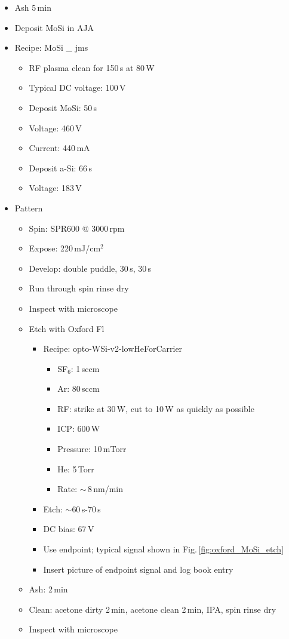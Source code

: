 \begin{itemize}
\item Ash 5\,min
\item Deposit MoSi in AJA
\item Recipe: MoSi \_ jms
\begin{itemize}
\item RF plasma clean for 150\,s at 80\,W
\item Typical DC voltage: 100\,V
\item Deposit MoSi: 50\,s
\item Voltage: 460\,V
\item Current: 440\,mA
\item Deposit a-Si: 66\,s
\item Voltage: 183\,V
\end{itemize}
\item Pattern
\begin{itemize}
\item Spin: SPR600 @ 3000\,rpm
\item Expose: 220\,mJ/cm$^2$
\item Develop: double puddle, 30\,s, 30\,s
\item Run through spin rinse dry
\item Inspect with microscope
\item Etch with Oxford Fl
\begin{itemize}
\item Recipe: opto-WSi-v2-lowHeForCarrier
\begin{itemize}
\item SF$_6$: 1\,sccm
\item Ar: 80\,sccm
\item RF: strike at 30\,W, cut to 10\,W as quickly as possible
\item ICP: 600\,W
\item Pressure: 10\,mTorr
\item He: 5\,Torr
\item Rate: $\sim$\,8\,nm/min
\end{itemize}
\item Etch: $\sim$60\,s-70\,s
\item DC bias: 67\,V
\item Use endpoint; typical signal shown in Fig.\,\ref{fig:oxford_MoSi_etch}
\item Insert picture of endpoint signal and log book entry
\end{itemize}
\item Ash: 2\,min
\item Clean: acetone dirty 2\,min, acetone clean 2\,min, IPA, spin rinse dry
\item Inspect with microscope
\end{itemize}
\end{itemize}